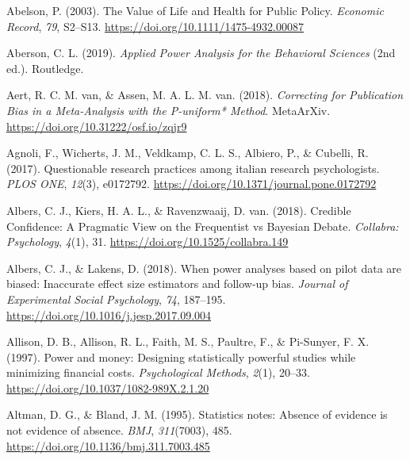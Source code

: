 \documentclass[
  letterpaper,
  DIV=11,
  numbers=noendperiod]{scrreprt}
\newlength{\cslhangindent}
\newlength{\cslentryspacingunit} %
\newenvironment{CSLReferences}[2] %
 {%
  \setlength{\parindent}{0pt}
  \ifodd #1
  \let\oldpar\par
  \def\par{\hangindent=\cslhangindent\oldpar}
  \fi
  \setlength{\parskip}{#2\cslentryspacingunit}
 }%
 {}
\begin{document}

\hypertarget{refs}{}
\begin{CSLReferences}{1}{0}
\leavevmode{}%
Abelson, P. (2003). The {Value} of {Life} and {Health} for {Public
Policy}. \emph{Economic Record}, \emph{79}, S2--S13.
\url{https://doi.org/10.1111/1475-4932.00087}

\leavevmode{}%
Aberson, C. L. (2019). \emph{Applied {Power Analysis} for the
{Behavioral Sciences}} (2nd ed.). {Routledge}.

\leavevmode{}%
Aert, R. C. M. van, \& Assen, M. A. L. M. van. (2018). \emph{Correcting
for {Publication Bias} in a {Meta-Analysis} with the {P-uniform}*
{Method}}. {MetaArXiv}. \url{https://doi.org/10.31222/osf.io/zqjr9}

\leavevmode{}%
Agnoli, F., Wicherts, J. M., Veldkamp, C. L. S., Albiero, P., \&
Cubelli, R. (2017). Questionable research practices among italian
research psychologists. \emph{PLOS ONE}, \emph{12}(3), e0172792.
\url{https://doi.org/10.1371/journal.pone.0172792}

\leavevmode{}%
Albers, C. J., Kiers, H. A. L., \& Ravenzwaaij, D. van. (2018). Credible
{Confidence}: {A Pragmatic View} on the {Frequentist} vs {Bayesian
Debate}. \emph{Collabra: Psychology}, \emph{4}(1), 31.
\url{https://doi.org/10.1525/collabra.149}

\leavevmode{}%
Albers, C. J., \& Lakens, D. (2018). When power analyses based on pilot
data are biased: {Inaccurate} effect size estimators and follow-up bias.
\emph{Journal of Experimental Social Psychology}, \emph{74}, 187--195.
\url{https://doi.org/10.1016/j.jesp.2017.09.004}

\leavevmode{}%
Allison, D. B., Allison, R. L., Faith, M. S., Paultre, F., \& Pi-Sunyer,
F. X. (1997). Power and money: {Designing} statistically powerful
studies while minimizing financial costs. \emph{Psychological Methods},
\emph{2}(1), 20--33. \url{https://doi.org/10.1037/1082-989X.2.1.20}

\leavevmode{}%
Altman, D. G., \& Bland, J. M. (1995). Statistics notes: {Absence} of
evidence is not evidence of absence. \emph{BMJ}, \emph{311}(7003), 485.
\url{https://doi.org/10.1136/bmj.311.7003.485}


\end{CSLReferences}
\end{document}

